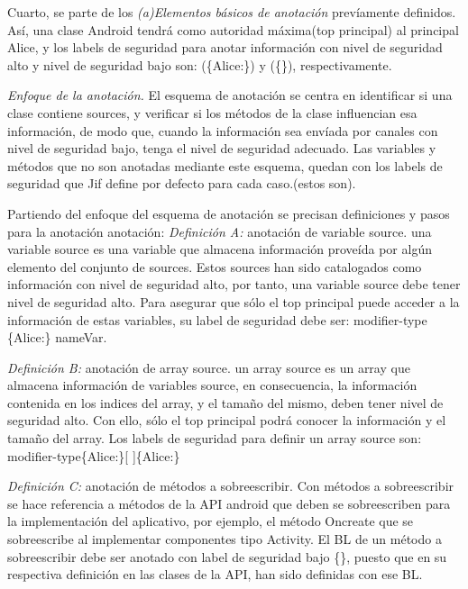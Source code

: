 Cuarto, se parte de los \textit{(a)Elementos básicos de anotación} prevíamente
definidos. Así, una clase Android tendrá como autoridad máxima(top principal) al
principal Alice, y los labels de seguridad para anotar información con nivel de
seguridad alto y nivel de seguridad bajo son: (\{Alice:\}) y (\{\}),
respectivamente.

\textit{Enfoque de la anotación.}\newline 
El esquema de anotación se centra en identificar si una clase contiene sources,
y verificar si los métodos de la clase influencian esa información, de modo que,
cuando la información sea envíada por canales con nivel de seguridad bajo, tenga
el nivel de seguridad adecuado.\newline 
Las variables y métodos que no son anotadas mediante este esquema, quedan con
los labels de seguridad que Jif define por defecto para cada caso.(estos son).

Partiendo del enfoque del esquema de anotación se precisan definiciones y pasos
para la anotación anotación:\newline
\textit{Definición A:} anotación de variable source.\newline
una variable source es una variable que almacena información
proveída por algún elemento del conjunto de sources. Estos sources han sido
catalogados como información con nivel de seguridad alto, por tanto, una
variable source debe tener nivel de seguridad alto. Para asegurar que sólo el
top principal puede acceder a la información de estas variables, su label de
seguridad debe ser: modifier-type \{Alice:\} nameVar.

\textit{Definición B:} anotación de array source.\newline
un array source es un array que almacena información de variables
source, en consecuencia, la información contenida en los indices del array, y el
tamaño del mismo, deben tener nivel de seguridad alto. Con ello, sólo el top
principal podrá conocer la información y el tamaño del array.
Los labels de seguridad para definir un array source son:\newline 
modifier-type\{Alice:\}[ ]\{Alice:\}

\textit{Definición C:} anotación de métodos a sobreescribir.\newline
Con métodos a sobreescribir se hace referencia a métodos de la API android que
deben se sobreescriben para la implementación del aplicativo, por ejemplo, el
método Oncreate que se sobreescribe al implementar componentes tipo
Activity.\newline 
El BL de un método a sobreescribir debe ser anotado con label de seguridad bajo
\{\}, puesto que en su respectiva definición en las clases de la API, han sido
definidas con ese BL.

